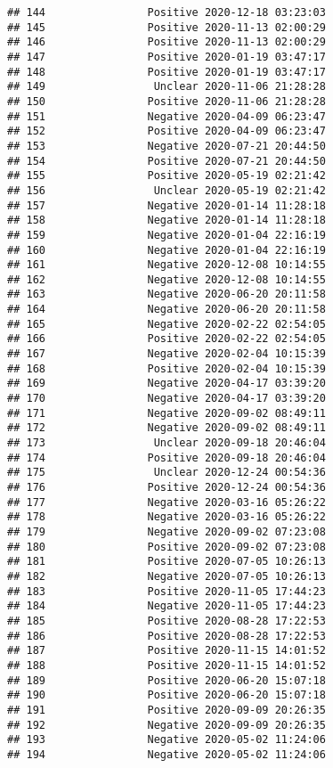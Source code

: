 \documentclass[
]{article}
\begin{document}
\begin{verbatim}
## 144                Positive 2020-12-18 03:23:03
## 145                Positive 2020-11-13 02:00:29
## 146                Positive 2020-11-13 02:00:29
## 147                Positive 2020-01-19 03:47:17
## 148                Positive 2020-01-19 03:47:17
## 149                 Unclear 2020-11-06 21:28:28
## 150                Positive 2020-11-06 21:28:28
## 151                Negative 2020-04-09 06:23:47
## 152                Positive 2020-04-09 06:23:47
## 153                Negative 2020-07-21 20:44:50
## 154                Positive 2020-07-21 20:44:50
## 155                Positive 2020-05-19 02:21:42
## 156                 Unclear 2020-05-19 02:21:42
## 157                Negative 2020-01-14 11:28:18
## 158                Negative 2020-01-14 11:28:18
## 159                Negative 2020-01-04 22:16:19
## 160                Negative 2020-01-04 22:16:19
## 161                Negative 2020-12-08 10:14:55
## 162                Negative 2020-12-08 10:14:55
## 163                Negative 2020-06-20 20:11:58
## 164                Negative 2020-06-20 20:11:58
## 165                Negative 2020-02-22 02:54:05
## 166                Positive 2020-02-22 02:54:05
## 167                Negative 2020-02-04 10:15:39
## 168                Positive 2020-02-04 10:15:39
## 169                Negative 2020-04-17 03:39:20
## 170                Negative 2020-04-17 03:39:20
## 171                Negative 2020-09-02 08:49:11
## 172                Negative 2020-09-02 08:49:11
## 173                 Unclear 2020-09-18 20:46:04
## 174                Positive 2020-09-18 20:46:04
## 175                 Unclear 2020-12-24 00:54:36
## 176                Positive 2020-12-24 00:54:36
## 177                Negative 2020-03-16 05:26:22
## 178                Negative 2020-03-16 05:26:22
## 179                Negative 2020-09-02 07:23:08
## 180                Positive 2020-09-02 07:23:08
## 181                Positive 2020-07-05 10:26:13
## 182                Negative 2020-07-05 10:26:13
## 183                Positive 2020-11-05 17:44:23
## 184                Negative 2020-11-05 17:44:23
## 185                Positive 2020-08-28 17:22:53
## 186                Positive 2020-08-28 17:22:53
## 187                Positive 2020-11-15 14:01:52
## 188                Positive 2020-11-15 14:01:52
## 189                Positive 2020-06-20 15:07:18
## 190                Positive 2020-06-20 15:07:18
## 191                Positive 2020-09-09 20:26:35
## 192                Negative 2020-09-09 20:26:35
## 193                Negative 2020-05-02 11:24:06
## 194                Negative 2020-05-02 11:24:06

\end{verbatim}
\end{document}
